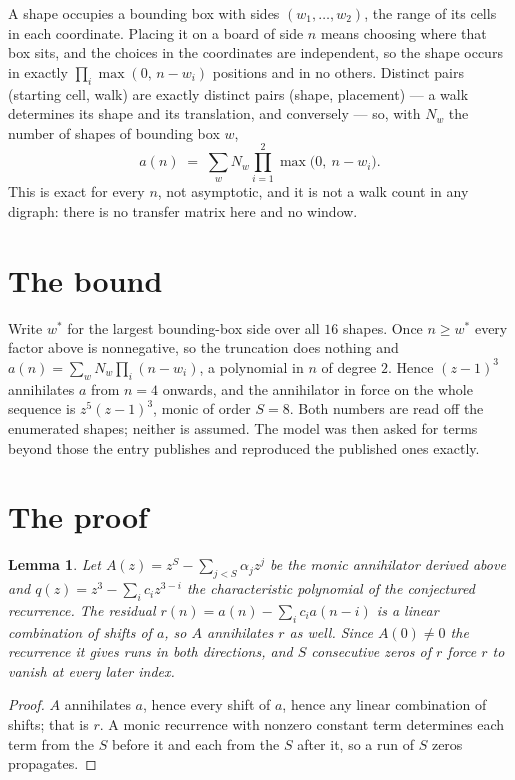 \documentclass[11pt,a4paper]{article}
\theoremstyle{plain}
\newtheorem{lemma}[theorem]{Lemma}
\theoremstyle{definition}
\begin{document}
A shape occupies a bounding box with sides $(w_1,\dots,w_{2})$, the range of its cells in each
coordinate. Placing it on a board of side $n$ means choosing where that box sits, and the
choices in the coordinates are independent, so the shape occurs in exactly
$\prod_{i}\max(0,\,n-w_i)$ positions and in no others. Distinct pairs (starting cell,
walk) are exactly distinct pairs (shape, placement) --- a walk determines its shape and its
translation, and conversely --- so, with $N_w$ the number of shapes of bounding box $w$,
\[
a(n)\;=\;\sum_{w} N_w \prod_{i=1}^{2}\max\bigl(0,\ n-w_i\bigr).
\]
This is exact for every $n$, not asymptotic, and it is not a walk count in any digraph: there is
no transfer matrix here and no window.

\section{The bound}

Write $w^\ast$ for the largest bounding-box side over all $16$ shapes. Once $n\ge w^\ast$
every factor above is nonnegative, so the truncation does nothing and
$a(n)=\sum_w N_w\prod_i(n-w_i)$, a polynomial in $n$ of degree $2$. Hence $(z-1)^{3}$
annihilates $a$ from $n=4$ onwards, and the annihilator in force on the whole sequence is
$z^{5}(z-1)^{3}$, monic of order $S=8$. Both numbers are read off the enumerated
shapes; neither is assumed. The model was then asked for terms beyond those the entry publishes
and reproduced the published ones exactly.

\section{The proof}

\begin{lemma}\label{lem:crit}
Let $A(z)=z^S-\sum_{j<S}\alpha_jz^{j}$ be the monic annihilator derived above and
$q(z)=z^{3}-\sum_ic_iz^{3-i}$ the characteristic polynomial of the conjectured
recurrence. The residual $r(n)=a(n)-\sum_ic_ia(n-i)$ is a linear combination of shifts of $a$,
so $A$ annihilates $r$ as well. Since $A(0)\ne0$ the recurrence it gives runs in both
directions, and $S$ consecutive zeros of $r$ force $r$ to vanish at every later index.
\end{lemma}

\begin{proof}
$A$ annihilates $a$, hence every shift of $a$, hence any linear combination of shifts; that is
$r$. A monic recurrence with nonzero constant term determines each term from the $S$ before it
and each from the $S$ after it, so a run of $S$ zeros propagates.
\end{proof}
\end{document}
